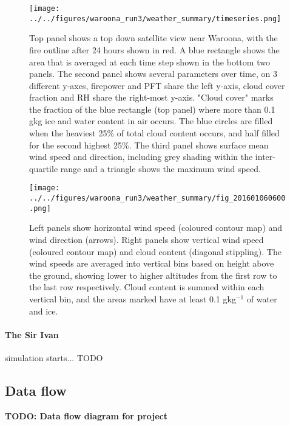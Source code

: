     \begin{figure}
      \texttt{[image: ../../figures/waroona\_run3/weather\_summary/timeseries.png]}
      \caption{%
        Top panel shows a top down satellite view near Waroona, with the fire outline after 24 hours shown in red. A blue rectangle shows the area that is averaged at each time step shown in the bottom two panels.
        The second panel shows several parameters over time, on 3 different y-axes, firepower and PFT share the left y-axis, cloud cover fraction and RH share the right-most y-axis.
        "Cloud cover" marks the fraction of the blue rectangle (top panel) where more than 0.1 g\/kg ice and water content in air occurs. 
        The blue circles are filled when the heaviest 25\% of total cloud content occurs, and half filled for the second highest 25\%.
        The third panel shows surface mean wind speed and direction, including grey shading within the inter-quartile range and a triangle shows the maximum wind speed.
        }
      \label{fig:model:weather_summary_timeseries}
    \end{figure}
    
    \begin{figure}
      \texttt{[image: ../../figures/waroona\_run3/weather\_summary/fig\_201601060600.png]}
      \caption{Left panels show horizontal wind speed (coloured contour map) and wind direction (arrows).
      Right panels show vertical wind speed (coloured contour map) and cloud content (diagonal stippling).
      The wind speeds are averaged into vertical bins based on height above the ground, showing lower to higher altitudes from the first row to the last row respectively.
      Cloud content is summed within each vertical bin, and the areas marked have at least 0.1 gkg$^{-1}$ of water and ice.}
      \label{fig:model:weather_summary_updraught}
    \end{figure}
    
    \paragraph{The Sir Ivan} simulation starts... TODO
    
  
  \subsection{Data flow}
    \textbf{TODO: Data flow diagram for project}
